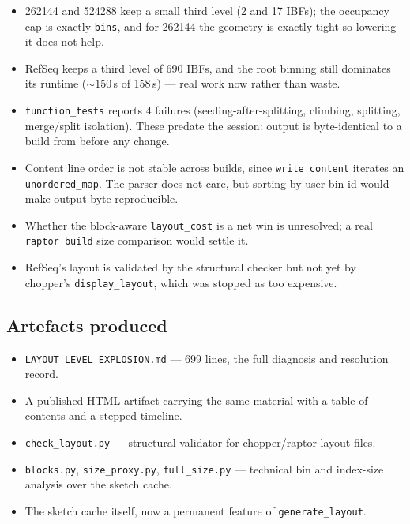 \documentclass[11pt,a4paper]{article}
\newcommand{\code}[1]{\lstinline[basicstyle=\ttfamily\small]!#1!}
\begin{document}
\begin{itemize}[leftmargin=*]
\item 262144 and 524288 keep a small third level (2 and 17 IBFs); the occupancy cap is exactly
\code{bins}, and for 262144 the geometry is exactly tight so lowering it does not help.
\item RefSeq keeps a third level of 690 IBFs, and the root binning still dominates its runtime
(${\sim}150$\,s of 158\,s) --- real work now rather than waste.
\item \texttt{function\_tests} reports 4 failures (seeding-after-splitting, climbing, splitting,
merge/split isolation). These predate the session: output is byte-identical to a build from before
any change.
\item Content line order is not stable across builds, since \code{write_content} iterates an
\code{unordered_map}. The parser does not care, but sorting by user bin id would make output
byte-reproducible.
\item Whether the block-aware \code{layout_cost} is a net win is unresolved; a real
\texttt{raptor build} size comparison would settle it.
\item RefSeq's layout is validated by the structural checker but not yet by chopper's
\texttt{display\_layout}, which was stopped as too expensive.
\end{itemize}

\subsection*{Artefacts produced}

\begin{itemize}[leftmargin=*]
\item \texttt{LAYOUT\_LEVEL\_EXPLOSION.md} --- 699 lines, the full diagnosis and resolution record.
\item A published HTML artifact carrying the same material with a table of contents and a stepped
timeline.
\item \texttt{check\_layout.py} --- structural validator for chopper/raptor layout files.
\item \texttt{blocks.py}, \texttt{size\_proxy.py}, \texttt{full\_size.py} --- technical bin and
index-size analysis over the sketch cache.
\item The sketch cache itself, now a permanent feature of \texttt{generate\_layout}.
\end{itemize}
\end{document}
